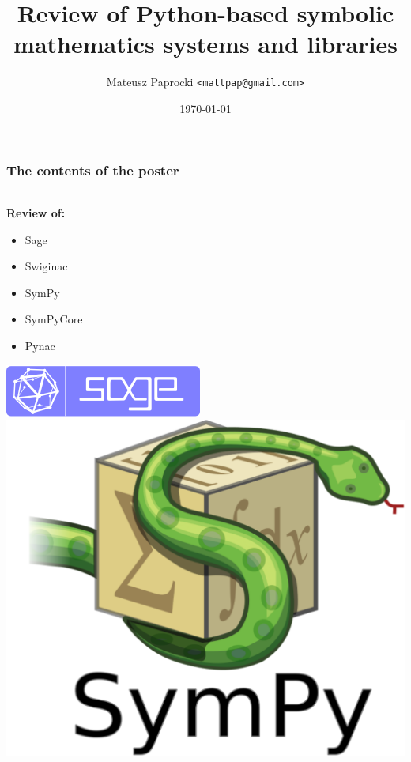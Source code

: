 \documentclass[10pt]{beamer}
\title{Review of Python-based symbolic mathematics \newline systems and libraries}
\author{Mateusz Paprocki \texttt{<mattpap@gmail.com>}}
\institute{SymPy Development Team}
\date{\today}
\begin{document}
\begin{frame}[plain,t]
    \maketitle
\end{frame}

\begin{frame}[fragile]
    \frametitle{The contents of the poster}
    \framesubtitle{}

    \begin{columns}
        \begin{column}[l]{0.4\textwidth}
            \textbf{Review of:}
            \begin{itemize}
                \item Sage
                \item Swiginac
                \item SymPy
                \item SymPyCore
                \item Pynac
            \end{itemize}
            \vspace{-0.5cm}
            \begin{center}
                \includegraphics[scale=0.2]{images/sage_logo_new.png}
                \includegraphics[scale=0.075]{images/sympy-logo.pdf}

\end{center}
\end{column}
\end{columns}
\end{frame}
\end{document}
